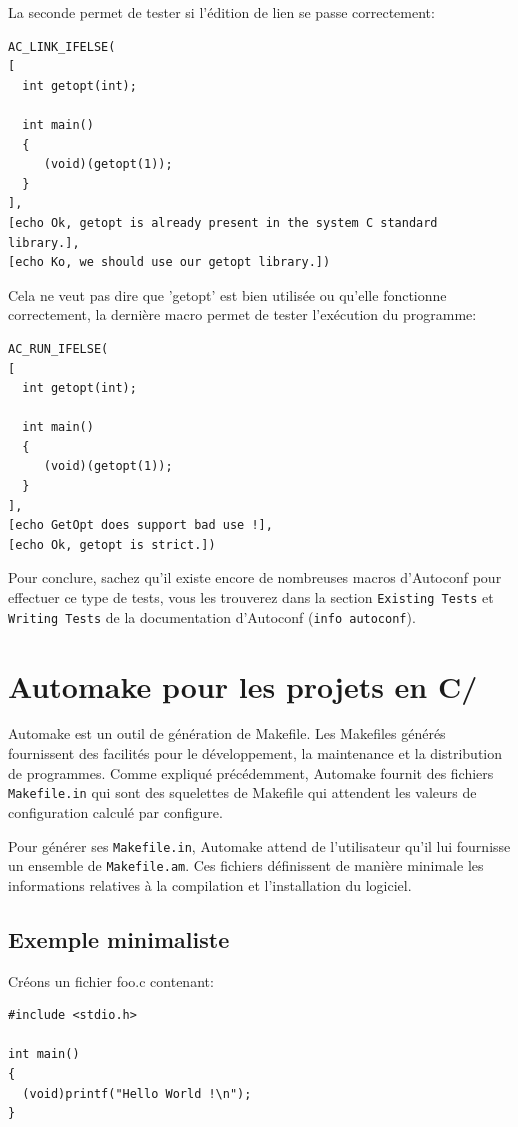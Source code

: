 \documentclass[11pt,a4paper]{article}
\begin{document}
La seconde permet de tester si l'édition de lien se passe correctement:
{\small
\begin{verbatim}
AC_LINK_IFELSE(
[
  int getopt(int);

  int main()
  {
     (void)(getopt(1));
  }
],
[echo Ok, getopt is already present in the system C standard library.],
[echo Ko, we should use our getopt library.])
\end{verbatim}
}

Cela ne veut pas dire que 'getopt' est bien utilisée ou qu'elle
fonctionne correctement, la dernière macro permet de tester
l'exécution du programme:

{\small
\begin{verbatim}
AC_RUN_IFELSE(
[
  int getopt(int);

  int main()
  {
     (void)(getopt(1));
  }
],
[echo GetOpt does support bad use !],
[echo Ok, getopt is strict.])
\end{verbatim}
}

Pour conclure, sachez qu'il existe encore de nombreuses macros
d'Autoconf pour effectuer ce type de tests, vous les trouverez dans la
section \texttt{Existing Tests} et \texttt{Writing Tests} de la
documentation d'Autoconf (\texttt{info autoconf}).

\section{\textsf{Automake} pour les projets en \textsf{C/\cpp}}

Automake est un outil de génération de Makefile. Les Makefiles générés
fournissent des facilités pour le développement, la maintenance et la
distribution de programmes. Comme expliqué précédemment, Automake
fournit des fichiers \texttt{Makefile.in} qui sont des squelettes de
Makefile qui attendent les valeurs de configuration calculé par
configure.

Pour générer ses \texttt{Makefile.in}, \textsf{Automake} attend de
l'utilisateur qu'il lui fournisse un ensemble de
\texttt{Makefile.am}. Ces fichiers définissent de manière minimale les
informations relatives à la compilation et l'installation du logiciel.

\subsection{Exemple minimaliste}

Créons un fichier foo.c contenant:
{\small
\begin{verbatim}
#include <stdio.h>

int main()
{
  (void)printf("Hello World !\n");
}
\end{verbatim}
}
\end{document}
